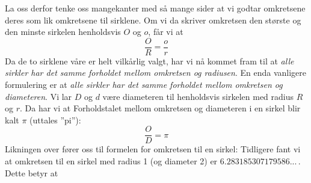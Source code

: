 {La oss derfor tenke oss mangekanter med så mange sider at vi godtar omkretsene deres som lik omkretsene til sirklene. Om vi da skriver omkretsen den største og den minste sirkelen henholdsvis $ O $ og $ o $, får vi at \vs
\[ \frac{O}{R}=\frac{o}{r} \]
Da de to sirklene våre er helt vilkårlig valgt, har vi nå kommet fram til at \textit{alle sirkler har det samme forholdet mellom omkretsen og radiusen}. En enda vanligere formulering er at \textit{alle sirkler har det samme forholdet mellom omkretsen og diameteren}. Vi lar $ D $ og $ d $ være diameteren til henholdsvis sirkelen med radius $ R $ og $ r $. Da har vi at
Forholdstalet mellom omkretsen og diameteren i en sirkel blir kalt $ \pi $ \index{$ \pi $}(uttales ''pi''):
\[ \frac{O}{D}=\pi \]
Likningen over fører oss til formelen for omkretsen til en sirkel:
Tidligere fant vi at omkretsen til en sirkel med radius 1 (og diameter 2) er $ 6.283185307179586... $\,. Dette betyr at
}

\newpage
{} \regv

